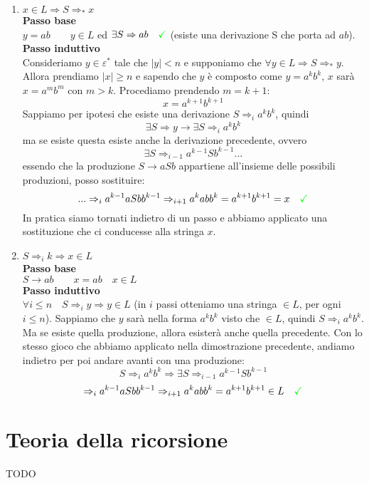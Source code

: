 \documentclass[a4paper,oneside]{scrbook}
\newcommand{\greenmark}{\quad \textcolor{green}{\checkmark}}
\begin{document}
\begin{enumerate}
	\item $x\in L \Rightarrow S \Rightarrow_* x $\\
	\textbf{Passo base}\\
	$y=ab \qquad y \in L$ ed $\exists S\Rightarrow ab \greenmark$ (esiste una derivazione S che porta ad $ab$).\\
	\textbf{Passo induttivo}\\
	Consideriamo $y \in \varepsilon^*$ tale che $|y|<n$ e supponiamo che $\forall y \in L \Rightarrow S \Rightarrow_* y$.\\
	Allora prendiamo $|x|\geq n$ e sapendo che $y$ è composto come $y=a^kb^k$, $x$ sarà $x=a^mb^m$ con $m>k$. Procediamo prendendo $m=k+1$:
	$$ x=a^{k+1}b^{k+1}$$
	Sappiamo per ipotesi che esiste una derivazione  $S\Rightarrow_i a^kb^k$, quindi
	$$\exists S \Rightarrow y \rightarrow \exists S \Rightarrow_i a^kb^k$$
	ma se esiste questa esiste anche la derivazione precedente, ovvero
	$$\exists S \Rightarrow_{i-1} a^{k-1}Sb^{k-1} ...$$
	essendo che la produzione $S\rightarrow aSb$ appartiene all'insieme delle possibili produzioni, posso sostituire:
	$$... \Rightarrow_i a^{k-1}aSbb^{k-1} \Rightarrow_{i+1} a^kabb^k = a^{k+1}b^{k+1} = x \greenmark$$
	In pratica siamo tornati indietro di un passo e abbiamo applicato una sostituzione che ci conducesse alla stringa $x$.
	
	\item $ S \Rightarrow_i k \Rightarrow x \in L$\\
	\textbf{Passo base}\\
	$S\rightarrow ab \qquad x=ab \quad x \in L$\\
	\textbf{Passo induttivo}\\
	$\forall i \leq n \quad S \Rightarrow_i y \Rightarrow y \in L $ (in $i$ passi otteniamo una stringa $\in L$, per ogni $i\leq n$).
	Sappiamo che $y$ sarà nella forma $a^kb^k$ visto che $\in L$, quindi $S \Rightarrow_i a^kb^k$. Ma se esiste quella produzione, allora
	esisterà anche quella precedente. Con lo stesso gioco che abbiamo applicato nella dimostrazione precedente, andiamo indietro per poi
	andare avanti con una produzione:
	$$S \Rightarrow_i a^kb^k \Rightarrow \exists S \Rightarrow_{i-1} a^{k-1}Sb^{k-1}$$
	$$\Rightarrow_i a^{k-1}aSbb^{k-1} \Rightarrow_{i+1} a^kabb^k = a^{k+1}b^{k+1} \in L \greenmark$$
\end{enumerate}

\chapter{Teoria della ricorsione}
TODO
\end{document}
